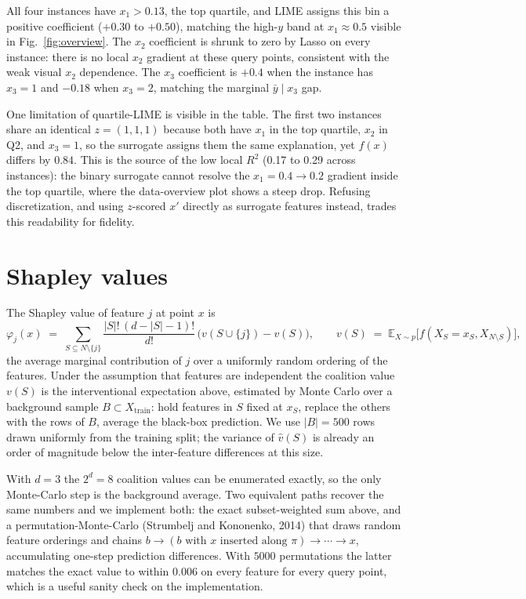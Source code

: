 \documentclass[10pt, a4paper]{article}
\begin{document}
All four instances have $x_1 > 0.13$, the top quartile, and LIME assigns this bin a positive coefficient ($+0.30$ to $+0.50$), matching the high-$y$ band at $x_1 \approx 0.5$ visible in Fig.~\ref{fig:overview}. The $x_2$ coefficient is shrunk to zero by Lasso on every instance: there is no local $x_2$ gradient at these query points, consistent with the weak visual $x_2$ dependence. The $x_3$ coefficient is $+0.4$ when the instance has $x_3 = 1$ and $-0.18$ when $x_3 = 2$, matching the marginal $\bar y \mid x_3$ gap.

One limitation of quartile-LIME is visible in the table. The first two instances share an identical $z = (1, 1, 1)$ because both have $x_1$ in the top quartile, $x_2$ in Q2, and $x_3 = 1$, so the surrogate assigns them the same explanation, yet $f(x)$ differs by $0.84$. This is the source of the low local $R^2$ (0.17 to 0.29 across instances): the binary surrogate cannot resolve the $x_1 = 0.4 \to 0.2$ gradient inside the top quartile, where the data-overview plot shows a steep drop. Refusing discretization, and using $z$-scored $x'$ directly as surrogate features instead, trades this readability for fidelity.

\clearpage

\section{Shapley values}

The Shapley value of feature $j$ at point $x$ is
$$
\varphi_j(x) \;=\; \sum_{S \subseteq N \setminus \{j\}}
   \frac{|S|!\,(d - |S| - 1)!}{d!}\, \bigl(v(S \cup \{j\}) - v(S)\bigr),
\qquad
v(S) \;=\; \mathbb E_{X \sim p}\!\bigl[f(X_S = x_S, X_{N \setminus S})\bigr],
$$
the average marginal contribution of $j$ over a uniformly random ordering of the features. Under the assumption that features are independent the coalition value $v(S)$ is the interventional expectation above, estimated by Monte Carlo over a background sample $B \subset X_{\text{train}}$: hold features in $S$ fixed at $x_S$, replace the others with the rows of $B$, average the black-box prediction. We use $|B| = 500$ rows drawn uniformly from the training split; the variance of $\hat v(S)$ is already an order of magnitude below the inter-feature differences at this size.

With $d = 3$ the $2^d = 8$ coalition values can be enumerated exactly, so the only Monte-Carlo step is the background average. Two equivalent paths recover the same numbers and we implement both: the exact subset-weighted sum above, and a permutation-Monte-Carlo (Strumbelj and Kononenko, 2014) that draws random feature orderings and chains $b \to (b \text{ with } x \text{ inserted along } \pi) \to \cdots \to x$, accumulating one-step prediction differences. With $5000$ permutations the latter matches the exact value to within $0.006$ on every feature for every query point, which is a useful sanity check on the implementation.
\end{document}
